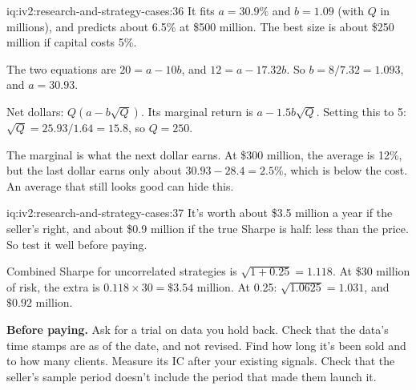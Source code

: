 \begin{solution}{iq:iv2:research-and-strategy-cases:36}
It fits $a = 30.9\%$ and $b = 1.09$ (with $Q$ in millions), and predicts about 6.5\% at \$500 million. The best size is about \$250 million if capital costs 5\%.

The two equations are $20 = a - 10b$, and $12 = a - 17.32b$. So $b = 8/7.32 = 1.093$, and $a = 30.93$.

Net dollars: $Q(a - b\sqrt{Q})$. Its marginal return is $a - 1.5b\sqrt{Q}$. Setting this to 5: $\sqrt{Q} = 25.93/1.64 = 15.8$, so $Q = 250$.

The marginal is what the next dollar earns. At \$300 million, the average is 12\%, but the last dollar earns only about $30.93 - 28.4 = 2.5\%$, which is below the cost. An average that still looks good can hide this.

\end{solution}

\begin{solution}{iq:iv2:research-and-strategy-cases:37}
It's worth about \$3.5 million a year if the seller's right, and about \$0.9 million if the true Sharpe is half: less than the price. So test it well before paying.

Combined Sharpe for uncorrelated strategies is $\sqrt{1 + 0.25} = 1.118$. At \$30 million of risk, the extra is $0.118 \times 30 = \$3.54$ million. At 0.25: $\sqrt{1.0625} = 1.031$, and $\$0.92$ million.

\textbf{Before paying.} Ask for a trial on data you hold back. Check that the data's time stamps are as of the date, and not revised. Find how long it's been sold and to how many clients. Measure its IC after your existing signals. Check that the seller's sample period doesn't include the period that made them launch it.

\end{solution}

